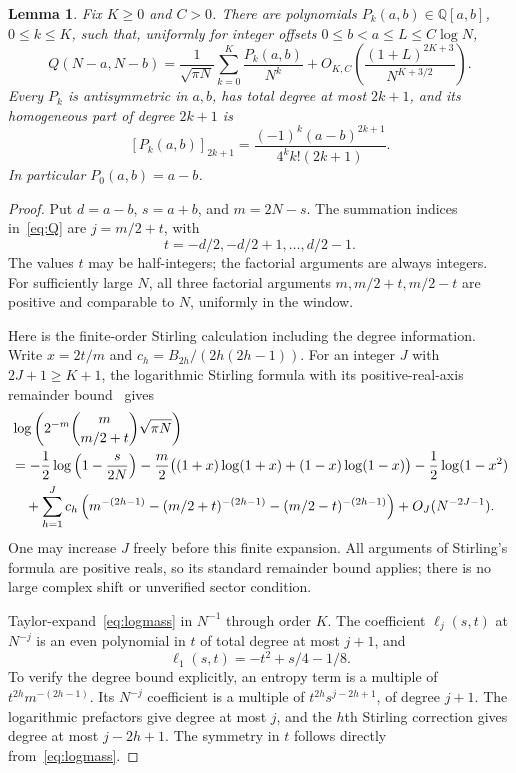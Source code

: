 \documentclass[11pt]{article}
\newtheorem{lemma}[theorem]{Lemma}
\theoremstyle{remark}
\begin{document}
\begin{lemma}\label{lem:local}
Fix $K\ge0$ and $C>0$. There are polynomials $P_k(a,b)\in\mathbb Q[a,b]$,
$0\le k\le K$, such that, uniformly for integer offsets
$0\le b<a\le L\le C\log N$,
\begin{equation}\label{eq:local}
 Q(N-a,N-b)=\frac1{\sqrt{\pi N}}\sum_{k=0}^K\frac{P_k(a,b)}{N^k}
 +O_{K,C}\left(\frac{(1+L)^{2K+3}}{N^{K+3/2}}\right).
\end{equation}
Every $P_k$ is antisymmetric in $a,b$, has total degree at most $2k+1$, and its
homogeneous part of degree $2k+1$ is
\begin{equation}\label{eq:top}
 [P_k(a,b)]_{2k+1}
 =\frac{(-1)^k(a-b)^{2k+1}}{4^k k!(2k+1)}.
\end{equation}
In particular $P_0(a,b)=a-b$.
\end{lemma}
\begin{proof}
Put $d=a-b$, $s=a+b$, and $m=2N-s$. The summation indices in~\eqref{eq:Q}
are $j=m/2+t$, with
\[
 t=-d/2,-d/2+1,\ldots,d/2-1.
\]
The values $t$ may be half-integers; the factorial arguments are always integers.
For sufficiently large $N$, all three factorial arguments $m,m/2+t,m/2-t$
are positive and comparable to $N$, uniformly in the window.

Here is the finite-order Stirling calculation including the degree information.
Write $x=2t/m$ and $c_h=B_{2h}/(2h(2h-1))$. For an integer $J$ with
$2J+1\ge K+1$, the logarithmic Stirling formula with its positive-real-axis
remainder bound~\cite{dlmf} gives
\begin{align}
 &\log\left(2^{-m}\binom{m}{m/2+t}\sqrt{\pi N}\right)\notag\\
 &=-\frac12\log\left(1-\frac{s}{2N}\right)
   -\frac m2\bigl((1+x)\log(1+x)+(1-x)\log(1-x)\bigr)
   -\frac12\log(1-x^2)\notag\\
 &\quad+\sum_{h=1}^J c_h
 \left(m^{-(2h-1)}-(m/2+t)^{-(2h-1)}-(m/2-t)^{-(2h-1)}\right)
 +O_J(N^{-2J-1}).\label{eq:logmass}
\end{align}
One may increase $J$ freely before this finite expansion. All arguments of
Stirling's formula are positive reals, so its standard remainder bound applies;
there is no large complex shift or unverified sector condition.

Taylor-expand~\eqref{eq:logmass} in $N^{-1}$ through order $K$.
The coefficient $\ell_j(s,t)$ at $N^{-j}$ is an even polynomial in $t$ of
total degree at most $j+1$, and
\[
 \ell_1(s,t)=-t^2+s/4-1/8.
\]
To verify the degree bound explicitly, an entropy term is a multiple of
$t^{2h}m^{-(2h-1)}$. Its $N^{-j}$ coefficient is a multiple of
$t^{2h}s^{j-2h+1}$, of degree $j+1$. The logarithmic prefactors give degree
at most $j$, and the $h$th Stirling correction gives degree at most $j-2h+1$.
The symmetry in $t$ follows directly from~\eqref{eq:logmass}.


\end{proof}
\end{document}
